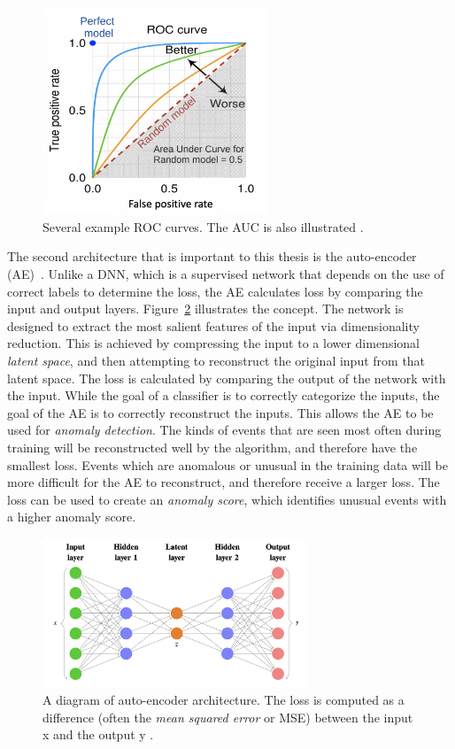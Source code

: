 \begin{figure}[!htbp]
\centering
   \includegraphics[width=0.6\textwidth]{figures/ml/roc_example}
    \caption{Several example ROC curves. The AUC is also illustrated \cite{auc_example}.
    \label{fig:roc}}
\end{figure}

The second architecture that is important to this thesis is the auto-encoder (AE)~\cite{autoencoders}. 
Unlike a DNN, which is a supervised network that depends on the use of correct labels to determine the loss, the AE calculates loss by comparing the input and output layers.
Figure~\ref{fig:ae} illustrates the concept.
The network is designed to extract the most salient features of the input via dimensionality reduction.
This is achieved by compressing the input to a lower dimensional \textit{latent space}, and then attempting to reconstruct the original input from that latent space.
The loss is calculated by comparing the output of the network with the input.
While the goal of a classifier is to correctly categorize the inputs, the goal of the AE is to correctly reconstruct the inputs.
This allows the AE to be used for \textit{anomaly detection}.
The kinds of events that are seen most often during training will be reconstructed well by the algorithm, and therefore have the smallest loss.
Events which are anomalous or unusual in the training data will be more difficult for the AE to reconstruct, and therefore receive a larger loss. 
The loss can be used to create an \textit{anomaly score}, which identifies unusual events with a higher anomaly score.

\begin{figure}[!htbp]
\centering
   \includegraphics[width=0.7\textwidth]{figures/ml/ae}
    \caption{A diagram of auto-encoder architecture. The loss is computed as a difference (often the \textit{mean squared error} or MSE) between the input x and the output y \cite{vrnn}.
    \label{fig:ae}}
\end{figure}




